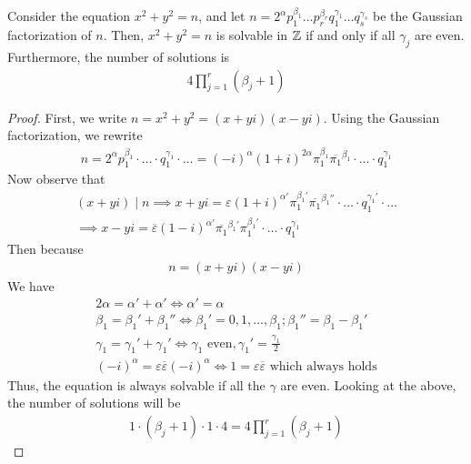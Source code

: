 \documentclass{memoir}
\begin{document}
\begin{thm}
Consider the equation \(x^2+y^2 = n\), and let \(n = 2^{\alpha}p_1^{\beta_1}\ldots p_r^{\beta_r}q_1^{\gamma_1}\ldots q_s^{\gamma_s}\) be the Gaussian factorization of \(n\). Then, \(x^2+y^2 = n\) is solvable in \(\mathbb{Z}\) if and only if all \(\gamma_j\) are even. Furthermore, the number of solutions is
\begin{align*}
	4 \prod_{j=1}^{r} (\beta_j + 1) 
\end{align*}
\end{thm}
\begin{proof}
	First, we write \(n = x^2+y^2 = (x+yi)(x-yi)\). Using the Gaussian factorization, we rewrite
	\begin{align*}
		n = 2^{\alpha}p_1^{\beta_1}\cdot \ldots\cdot q_1^{\gamma_1}\cdot \ldots = (-i)^{\alpha}(1+i)^{2\alpha}\pi_1^{\beta_1}\overline{\pi_1}^{\beta_1}\cdot \ldots\cdot q_1^{\gamma_1}
	\end{align*}
	Now observe that
	\begin{align*}
		(x+yi)\mid n \implies x+yi = \varepsilon (1+i)^{\alpha'}\pi_1^{\beta_1'}\overline{\pi_1}^{\beta_1''}\cdot \ldots\cdot q_1^{\gamma_1'}\cdot \ldots \\
		\implies x-yi = \overline{\varepsilon}(1-i)^{\alpha'}\overline{\pi_1}^{\beta_1'}\pi_1^{\beta_1'}\cdot \ldots\cdot q_1^{\gamma_1}
	\end{align*}
	Then because
	\begin{align*}
		n = (x+yi)(x-yi)
	\end{align*}
	We have
	\begin{align*}
		  2\alpha = \alpha' + \alpha' \iff\alpha' = \alpha\\
		\beta_1 = \beta_1' + \beta_1'' \iff \beta_1' = 0,1,\ldots,\beta_1; \beta_1'' = \beta_1-\beta_1' \\
		\gamma_1 = \gamma_1' + \gamma_1' \iff \gamma_1 \text{ even}, \gamma_1' = \frac{\gamma_1}{2}\\
		(-i)^{\alpha} = \varepsilon \overline{\varepsilon}(-i)^{\alpha} \iff 1 = \varepsilon \overline{\varepsilon} \text{ which always holds}
	\end{align*}
	Thus, the equation is always solvable if all the \(\gamma\) are even. Looking at the above, the number of solutions will be
	\begin{align*}
		1 \cdot (\beta_j+1) \cdot 1 \cdot 4 = 4 \prod_{j=1}^{r} (\beta_j + 1) 
	\end{align*}
\end{proof}
\end{document}
